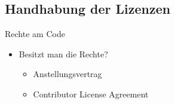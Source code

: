 
\subsection{Handhabung der Lizenzen}
\label{sec:handhabung}
\subsectionframe

\begin{frame}{Rechte am Code}
	\pause
	\begin{itemize}
		\item Besitzt man die Rechte?
		\pause
		\begin{itemize}
			\item Anstellungsvertrag
			\item Contributor License Agreement
		\end{itemize}
	\end{itemize}
\end{frame}


